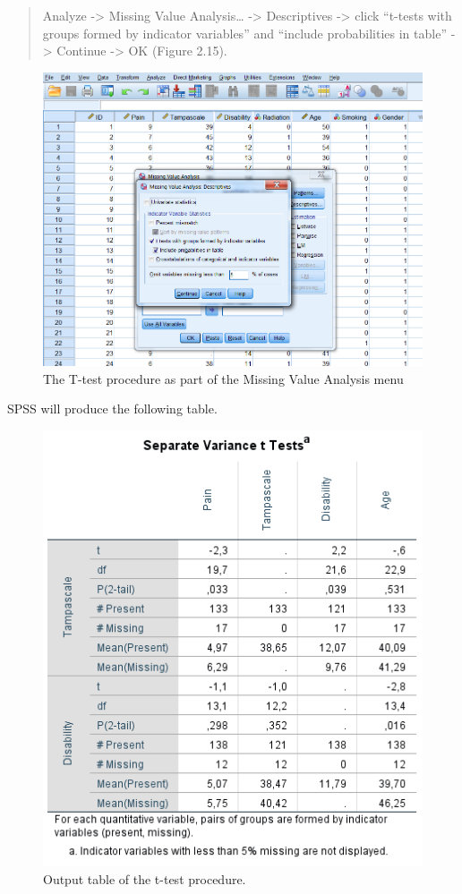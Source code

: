 \documentclass[
]{book}
\begin{document}
\begin{quote}
Analyze -\textgreater{} Missing Value Analysis\ldots{} -\textgreater{} Descriptives -\textgreater{} click ``t-tests with groups formed by indicator variables'' and ``include probabilities in table'' -\textgreater{} Continue -\textgreater{} OK (Figure 2.15).
\end{quote}

\begin{figure}

{\centering \includegraphics[width=0.9\linewidth]{images/fig2.11} 

}

\caption{The T-test procedure as part of the Missing Value Analysis menu}\label{fig:fig2-11}
\end{figure}

SPSS will produce the following table.

\begin{figure}

{\centering \includegraphics[width=0.7\linewidth]{images/tab2.5} 

}

\caption{Output table of the t-test procedure.}\label{fig:tab2-5}
\end{figure}
\end{document}
